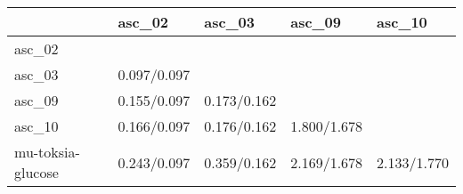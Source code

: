 \begin{tabular}{lllll}
\toprule
{} &       asc\_02 &       asc\_03 &       asc\_09 &       asc\_10 \\
\midrule
asc\_02            &              &              &              &              \\
asc\_03            &  0.097/0.097 &              &              &              \\
asc\_09            &  0.155/0.097 &  0.173/0.162 &              &              \\
asc\_10            &  0.166/0.097 &  0.176/0.162 &  1.800/1.678 &              \\
mu-toksia-glucose &  0.243/0.097 &  0.359/0.162 &  2.169/1.678 &  2.133/1.770 \\
\bottomrule
\end{tabular}
